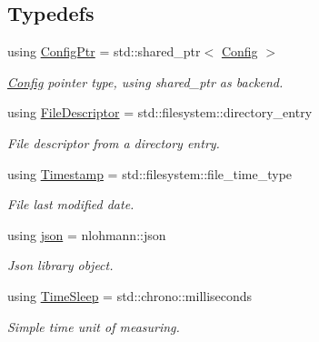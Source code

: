 \subsection*{Typedefs}
\begin{DoxyCompactItemize}
\item 
using \hyperlink{namespacecfg_af5f3a3fc2010c76e90bc66696485989f}{Config\+Ptr} = std\+::shared\+\_\+ptr$<$ \hyperlink{classcfg_1_1_config}{Config} $>$
\begin{DoxyCompactList}\small\item\em \hyperlink{classcfg_1_1_config}{Config} pointer type, using shared\+\_\+ptr as backend. \end{DoxyCompactList}\item 
using \hyperlink{namespacecfg_af0aed6e47bd26e91ad7d69467f96caaf}{File\+Descriptor} = std\+::filesystem\+::directory\+\_\+entry
\begin{DoxyCompactList}\small\item\em File descriptor from a directory entry. \end{DoxyCompactList}\item 
using \hyperlink{namespacecfg_aa17d58439174a5af7fb3f37a3cdd6d0b}{Timestamp} = std\+::filesystem\+::file\+\_\+time\+\_\+type
\begin{DoxyCompactList}\small\item\em File last modified date. \end{DoxyCompactList}\item 
using \hyperlink{namespacecfg_a4b03b67363586260311e07e8b27bd5ac}{json} = nlohmann\+::json
\begin{DoxyCompactList}\small\item\em Json library object. \end{DoxyCompactList}\item 
using \hyperlink{namespacecfg_ab1a8f7060b6dfea6111c4449e81c6f8c}{Time\+Sleep} = std\+::chrono\+::milliseconds
\begin{DoxyCompactList}\small\item\em Simple time unit of measuring. \end{DoxyCompactList}\end{DoxyCompactItemize}
